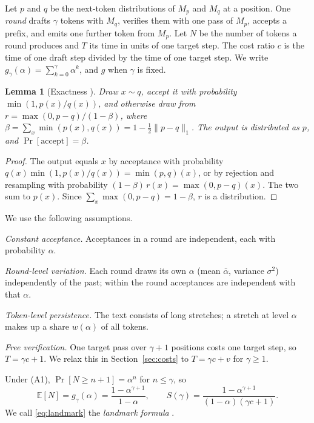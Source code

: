 \documentclass[10pt]{article}
\newtheorem{lemma}{Lemma}
\theoremstyle{remark}
\newcommand{\E}{\mathbb{E}}
\newcommand{\abar}{\bar{\alpha}}
\begin{document}
Let $p$ and $q$ be the next-token distributions of $M_p$ and $M_q$ at a position. One \emph{round} drafts $\gamma$
tokens with $M_q$, verifies them with one pass of $M_p$, accepts a prefix, and emits one further token from $M_p$.
Let $N$ be the number of tokens a round produces and $T$ its time in units of one target step. The cost ratio $c$ is
the time of one draft step divided by the time of one target step. We write $g_\gamma(\alpha)=\sum_{k=0}^{\gamma}\alpha^k$,
and $g$ when $\gamma$ is fixed.

\begin{lemma}[Exactness \cite{leviathan,chen}]\label{lem:exact}
Draw $x\sim q$, accept it with probability $\min(1,p(x)/q(x))$, and otherwise draw from
$r=\max(0,p-q)/(1-\beta)$, where $\beta=\sum_x \min(p(x),q(x)) = 1-\tfrac12\lVert p-q\rVert_1$. The output is
distributed as $p$, and $\Pr[\text{accept}]=\beta$.
\end{lemma}
\begin{proof}
The output equals $x$ by acceptance with probability $q(x)\min(1,p(x)/q(x))=\min(p,q)(x)$, or by rejection and
resampling with probability $(1-\beta)\,r(x)=\max(0,p-q)(x)$. The two sum to $p(x)$. Since
$\sum_x\max(0,p-q)=1-\beta$, $r$ is a distribution.
\end{proof}

We use the following assumptions.
\begin{description}\setlength{\itemsep}{0pt}
\item[(A1)] \emph{Constant acceptance.} Acceptances in a round are independent, each with probability $\alpha$.
\item[(A1$'$)] \emph{Round-level variation.} Each round draws its own $\alpha$ (mean $\abar$, variance $\sigma^2$)
independently of the past; within the round acceptances are independent with that $\alpha$.
\item[(A1$''$)] \emph{Token-level persistence.} The text consists of long stretches; a stretch at level $\alpha$
makes up a share $w(\alpha)$ of all tokens.
\item[(A2)] \emph{Free verification.} One target pass over $\gamma+1$ positions costs one target step, so
$T=\gamma c+1$. We relax this in Section~\ref{sec:costs} to $T=\gamma c+v$ for $\gamma\ge 1$.
\end{description}
Under (A1), $\Pr[N\ge n+1]=\alpha^n$ for $n\le\gamma$, so
\begin{equation}\label{eq:landmark}
\E[N]=g_\gamma(\alpha)=\frac{1-\alpha^{\gamma+1}}{1-\alpha},\qquad
S(\gamma)=\frac{1-\alpha^{\gamma+1}}{(1-\alpha)(\gamma c+1)} .
\end{equation}
We call \eqref{eq:landmark} the \emph{landmark formula} \cite[Theorem~3.8]{leviathan}.
\end{document}
